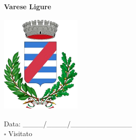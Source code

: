 \documentclass[a5paper,12pt]{article}
\begin{document}
\newpage

\noindent
\begin{minipage}[t]{0.45\textwidth}
    \begin{center}
        \textbf{Varese Ligure}
    \end{center}
    \vspace{-0.5cm} %
    \begin{center}
        \includegraphics[height= 5cm, width=4cm]{Liguria/Stemma Varese Ligure.png}
    \end{center}
    \vspace{-0.4cm} %
    \begin{flushleft}
        Data: \_\_\_\_/\_\_\_\_/\_\_\_\_\_\_\_\_\_\_\_\_ \\
        $\square$ Visitato
    \end{flushleft}
\end{minipage}
\hfill
\end{document}
